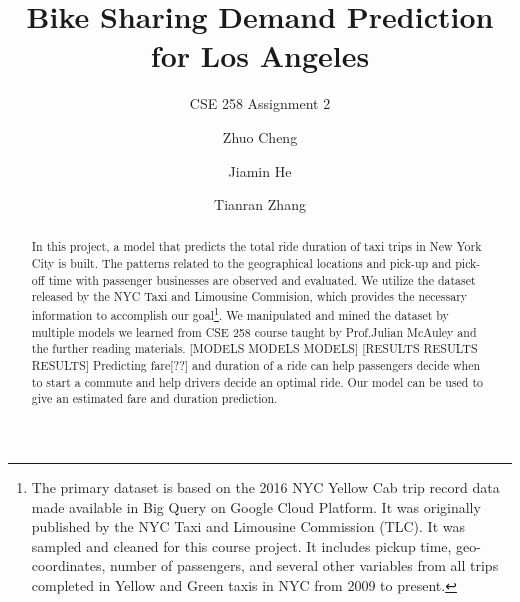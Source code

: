 \documentclass[sigconf]{acmart}
\begin{document}
\title{Bike Sharing Demand Prediction for Los Angeles}
\subtitle{CSE 258 Assignment 2}



\author{Zhuo Cheng}

\author{Jiamin He}

\author{Tianran Zhang}




\begin{abstract}
  In this project, a model that predicts the total ride duration of taxi trips in New York City is built. The patterns related to the geographical locations and pick-up and pick-off time with passenger businesses are observed and evaluated. We utilize the dataset released by the NYC Taxi and Limousine Commision, which provides the necessary information to accomplish our goal\footnote{The primary dataset is based on the 2016 NYC Yellow Cab trip record data made available in Big Query on Google Cloud Platform. It was originally published by the NYC Taxi and Limousine Commission (TLC). It was sampled and cleaned for this course project. It includes pickup time, geo-coordinates, number of passengers, and several other variables from all trips completed in Yellow and Green taxis in NYC from 2009 to present.}. 
  We manipulated and mined the dataset by multiple models we learned from CSE 258 course taught by Prof.Julian McAuley and the further reading materials. [MODELS MODELS MODELS] [RESULTS RESULTS RESULTS] Predicting fare[??] and duration of a ride can help passengers decide when to start a commute and help drivers decide an optimal ride. Our model can be used to give an estimated fare and duration prediction.



\end{abstract}




\maketitle
\end{document}
